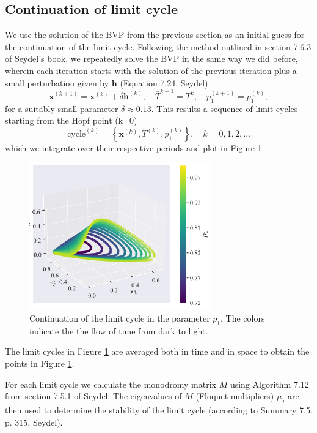 \subsection{Continuation of limit cycle}
We use the solution of the BVP from the previous section as an initial guess for the continuation of the limit cycle.
Following the method outlined in section 7.6.3 of Seydel's book, we repeatedly solve the BVP in the same way we did before, wherein each 
iteration starts with the solution of the previous iteration plus a small perturbation given 
by $\mathbf{h}$ (Equation 7.24, Seydel)
\[
    \bar{\mathbf{x}}^{(k+1)} = \mathbf{x}^{(k)} + \delta \mathbf{h}^{(k)}, \quad \bar{T}^{k+1} = T^{k}, \quad \bar{p}_1^{(k+1)} = p_1^{(k)},
\]
for a suitably small parameter $\delta \approx 0.13$. This results a sequence of limit cycles starting from the Hopf point (k=0)
\[
    \textrm{cycle}^{(k)} = \left\{\mathbf{x}^{(k)}, T^{(k)}, p_1^{(k)} \right\}, \quad k = 0, 1, 2, \ldots
\]
which we integrate over their respective periods and plot in Figure \ref{fig:mcm_limit_cycle_continuation}.
\begin{figure}[H]
    \centering
    \includegraphics[width=0.7\textwidth]{figures/mcm_limit_cycles.png}
    \caption{Continuation of the limit cycle in the parameter $p_1$. The colors indicate the the flow of time
    from dark to light.}
    \label{fig:mcm_limit_cycle_continuation}
\end{figure}
The limit cycles in Figure \ref{fig:mcm_limit_cycle_continuation} are averaged both in time and in space to obtain the points in 
Figure \ref{fig:mcm_limit_cycle_continuation}.

For each limit cycle we calculate the monodromy matrix $M$ using Algorithm 7.12
from section 7.5.1 of Seydel. The eigenvalues of $M$ (Floquet multipliers) $\mu_j$ are then used to determine the stability of the limit cycle
(according to Summary 7.5, p. 315, Seydel).

